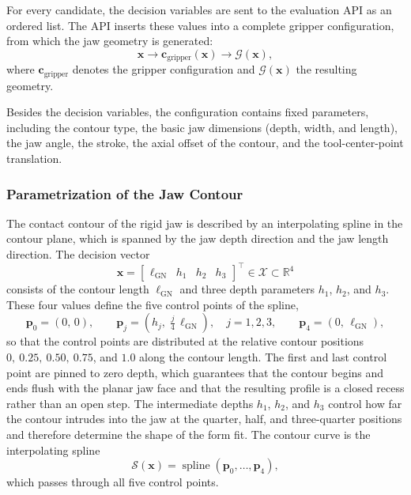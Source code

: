 For every candidate, the decision variables are sent to the evaluation API as an ordered list. The
API inserts these values into a complete gripper configuration, from which the jaw geometry is
generated:
\begin{equation}
    \mathbf{x}
    \longrightarrow
    \mathbf{c}_{\mathrm{gripper}}(\mathbf{x})
    \longrightarrow
    \mathcal{G}(\mathbf{x}),
\end{equation}
where $\mathbf{c}_{\mathrm{gripper}}$ denotes the gripper configuration and
$\mathcal{G}(\mathbf{x})$ the resulting geometry.

Besides the decision variables, the configuration contains fixed parameters, including the contour
type, the basic jaw dimensions (depth, width, and length), the jaw angle, the stroke, the axial
offset of the contour, and the tool-center-point translation.
\subsubsection{Parametrization of the Jaw Contour}
\label{sec:jaw_contour_parametrization}

The contact contour of the rigid jaw is described by an interpolating spline in the contour plane,
which is spanned by the jaw depth direction and the jaw length direction. The decision vector
\begin{equation}
    \mathbf{x}
    =
    \begin{bmatrix}
        \ell_{\mathrm{GN}} &
        h_1 &
        h_2 &
        h_3
    \end{bmatrix}^{\top}
    \in \mathcal{X} \subset \mathbb{R}^{4}
\end{equation}
consists of the contour length $\ell_{\mathrm{GN}}$ and three depth parameters $h_1$, $h_2$, and
$h_3$. These four values define the five control points of the spline,
\begin{equation}
    \mathbf{p}_0 = (0,\,0),
    \qquad
    \mathbf{p}_j
    =
    \left(
        h_j,\;
        \tfrac{j}{4}\,\ell_{\mathrm{GN}}
    \right),
    \quad j = 1,2,3,
    \qquad
    \mathbf{p}_4 = (0,\,\ell_{\mathrm{GN}}),
\end{equation}
so that the control points are distributed at the relative contour positions
$0,\ 0.25,\ 0.50,\ 0.75$, and $1.0$ along the contour length. The first and last control point are
pinned to zero depth, which guarantees that the contour begins and ends flush with the planar jaw
face and that the resulting profile is a closed recess rather than an open step. The intermediate
depths $h_1$, $h_2$, and $h_3$ control how far the contour intrudes into the jaw at the quarter,
half, and three-quarter positions and therefore determine the shape of the form fit. The contour
curve is the interpolating spline
\begin{equation}
    \mathcal{S}(\mathbf{x})
    =
    \operatorname{spline}
    \left(
        \mathbf{p}_0,\ldots,\mathbf{p}_4
    \right),
\end{equation}
which passes through all five control points.

